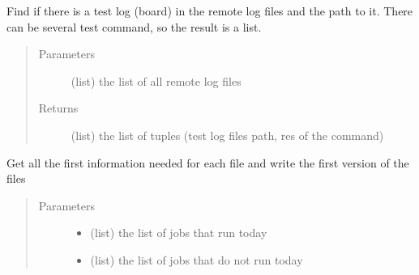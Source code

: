 \documentclass[a4paper,10pt,english]{sphinxmanual}
\begin{document}
\begin{fulllineitems}
\begin{fulllineitems}
\begin{quote}
\begin{description}
\begin{itemize}
\end{itemize}

\end{description}\end{quote}

\end{fulllineitems}


\begin{fulllineitems}
\label{\detokenize{apidoc_commands/commands:commands.jobs.Gui.find_test_log}}
Find if there is a test log (board) in the remote log files and 
the path to it. There can be several test command, 
so the result is a list.
\begin{quote}\begin{description}
\item[{Parameters}] \leavevmode
{} \textendash{} (list) the list of all remote log files

\item[{Returns}] \leavevmode
(list) 
the list of tuples (test log files path, res of the command)

\end{description}\end{quote}

\end{fulllineitems}


\begin{fulllineitems}
\label{\detokenize{apidoc_commands/commands:commands.jobs.Gui.initialize_boards}}
Get all the first information needed for each file and write the 
first version of the files
\begin{quote}\begin{description}
\item[{Parameters}] \leavevmode\begin{itemize}
\item {} 
 \textendash{} (list) the list of jobs that run today

\item {} 
 \textendash{} (list) the list of jobs that do not run today


\end{itemize}
\end{description}
\end{quote}
\end{fulllineitems}
\end{fulllineitems}
\end{document}

